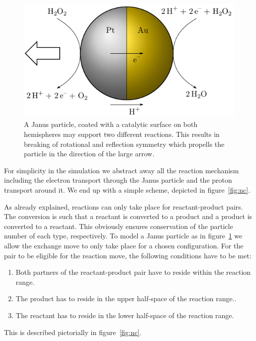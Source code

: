 \documentclass[aip,jcp,reprint,a4paper,onecolumn,nofootinbib,amsmath,amssymb]{revtex4-1}
\begin{document}
\begin{figure}
  \centering
  \includegraphics{FIGURES/janus-particle}
  \caption{A Janus particle, coated with a catalytic surface on both
    hemispheres may support two different reactions.  This results in
    breaking of rotational and reflection symmetry which propells the
    particle in the direction of the large arrow.}
  \label{fig:janus}
\end{figure}

For simplicity in the simulation we abstract away all the reaction
mechanism including the electron transport through the Janus particle
and the proton transport around it.  We end up with a simple scheme,
depicted in figure~\ref{fig:nc}.

As already explained, reactions can only take place for
reactant-product pairs.  The conversion is such that a reactant is
converted to a product and a product is converted to a reactant.  This
obviously ensures conservation of the particle number of each type,
respectively.  To model a Janus particle as in figure~\ref{fig:janus} we
allow the exchange move to only take place for a chosen configuration.
For the pair to be eligible for the reaction move, the following
conditions have to be met:
\begin{enumerate}
\item Both partners of the reactant-product pair have to reside within
  the reaction range.
\item The product has to reside in the upper half-space of the
  reaction range..
\item The reactant has to reside in the lower half-space of the
  reaction range.
\end{enumerate}
This is described pictorially in figure~\ref{fig:nc}.
\end{document}
